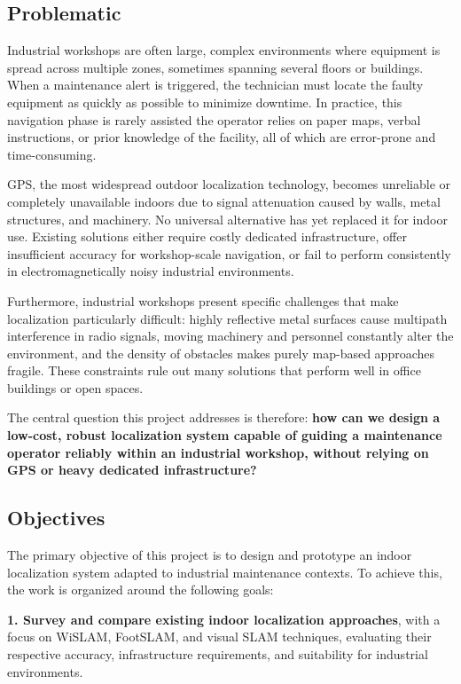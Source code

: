 \documentclass{ipgpmaster}
\begin{document}
 
\subsection{Problematic}

Industrial workshops are often large, complex environments where equipment is spread across multiple zones, sometimes spanning several floors or buildings. When a maintenance alert is triggered, the technician must locate the faulty equipment as quickly as possible to minimize downtime. In practice, this navigation phase is rarely assisted the operator relies on paper maps, verbal instructions, or prior knowledge of the facility, all of which are error-prone and time-consuming.

GPS, the most widespread outdoor localization technology, becomes unreliable or completely unavailable indoors due to signal attenuation caused by walls, metal structures, and machinery. No universal alternative has yet replaced it for indoor use. Existing solutions either require costly dedicated infrastructure, offer insufficient accuracy for workshop-scale navigation, or fail to perform consistently in electromagnetically noisy industrial environments.

Furthermore, industrial workshops present specific challenges that make localization particularly difficult: highly reflective metal surfaces cause multipath interference in radio signals, moving machinery and personnel constantly alter the environment, and the density of obstacles makes purely map-based approaches fragile. These constraints rule out many solutions that perform well in office buildings or open spaces.

The central question this project addresses is therefore: \textbf{how can we design a low-cost, robust localization system capable of guiding a maintenance operator reliably within an industrial workshop, without relying on GPS or heavy dedicated infrastructure?}


 \subsection{Objectives}

 The primary objective of this project is to design and prototype an indoor localization system adapted to industrial maintenance contexts. To achieve this, the work is organized around the following goals:

\textbf{1. Survey and compare existing indoor localization approaches}, with a focus on WiSLAM, FootSLAM, and visual SLAM techniques, evaluating their respective accuracy, infrastructure requirements, and suitability for industrial environments.
\end{document}
